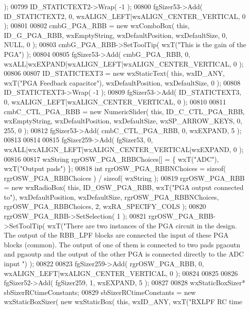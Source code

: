 \begin{DoxyCode}
       );
00799     ID_STATICTEXT2->Wrap( -1 );
00800     fgSizer53->Add( ID_STATICTEXT2, 0, wxALIGN\_LEFT|wxALIGN\_CENTER\_VERTICAL, 0 );
00801     
00802     cmbG_PGA_RBB = \textcolor{keyword}{new} wxComboBox( \textcolor{keyword}{this}, ID_G_PGA_RBB, wxEmptyString, wxDefaultPosition, wxDefaultSize, 0, 
      NULL, 0 ); 
00803     cmbG_PGA_RBB->SetToolTip( wxT(\textcolor{stringliteral}{"This is the gain of the PGA"}) );
00804     
00805     fgSizer53->Add( cmbG_PGA_RBB, 0, wxALL|wxEXPAND|wxALIGN\_LEFT|wxALIGN\_CENTER\_VERTICAL, 0 );
00806     
00807     ID_STATICTEXT3 = \textcolor{keyword}{new} wxStaticText( \textcolor{keyword}{this}, wxID\_ANY, wxT(\textcolor{stringliteral}{"PGA Feedback capacitor"}), wxDefaultPosition, 
      wxDefaultSize, 0 );
00808     ID_STATICTEXT3->Wrap( -1 );
00809     fgSizer53->Add( ID_STATICTEXT3, 0, wxALIGN\_LEFT|wxALIGN\_CENTER\_VERTICAL, 0 );
00810     
00811     cmbC_CTL_PGA_RBB = \textcolor{keyword}{new} NumericSlider( \textcolor{keyword}{this}, ID_C_CTL_PGA_RBB, wxEmptyString, wxDefaultPosition, 
      wxDefaultSize, wxSP\_ARROW\_KEYS, 0, 255, 0 );
00812     fgSizer53->Add( cmbC_CTL_PGA_RBB, 0, wxEXPAND, 5 );
00813     
00814     
00815     fgSizer259->Add( fgSizer53, 0, wxALL|wxALIGN\_LEFT|wxALIGN\_CENTER\_VERTICAL|wxEXPAND, 0 );
00816     
00817     wxString rgrOSW\_PGA\_RBBChoices[] = \{ wxT(\textcolor{stringliteral}{"ADC"}), wxT(\textcolor{stringliteral}{"Output pads"}) \};
00818     \textcolor{keywordtype}{int} rgrOSW\_PGA\_RBBNChoices = \textcolor{keyword}{sizeof}( rgrOSW\_PGA\_RBBChoices ) / \textcolor{keyword}{sizeof}( wxString );
00819     rgrOSW_PGA_RBB = \textcolor{keyword}{new} wxRadioBox( \textcolor{keyword}{this}, ID_OSW_PGA_RBB, wxT(\textcolor{stringliteral}{"PGA output connected to"}), 
      wxDefaultPosition, wxDefaultSize, rgrOSW\_PGA\_RBBNChoices, rgrOSW\_PGA\_RBBChoices, 2, wxRA\_SPECIFY\_COLS );
00820     rgrOSW_PGA_RBB->SetSelection( 1 );
00821     rgrOSW_PGA_RBB->SetToolTip( wxT(\textcolor{stringliteral}{"There are two instances of the PGA circuit in the design. The output
       of the RBB\_LPF blocks are connected the input of these PGA blocks (common). The output of one of them is
       connected to two pads pgaoutn and pgaoutp and the output of the other PGA is connected directly to the ADC input
      "}) );
00822     
00823     fgSizer259->Add( rgrOSW_PGA_RBB, 0, wxALIGN\_LEFT|wxALIGN\_CENTER\_VERTICAL, 0 );
00824     
00825     
00826     fgSizer52->Add( fgSizer259, 1, wxEXPAND, 5 );
00827     
00828     wxStaticBoxSizer* sbSizerRCtimeConstants;
00829     sbSizerRCtimeConstants = \textcolor{keyword}{new} wxStaticBoxSizer( \textcolor{keyword}{new} wxStaticBox( \textcolor{keyword}{this}, wxID\_ANY, wxT(\textcolor{stringliteral}{"RXLPF RC time
}
\end{DoxyCode}
